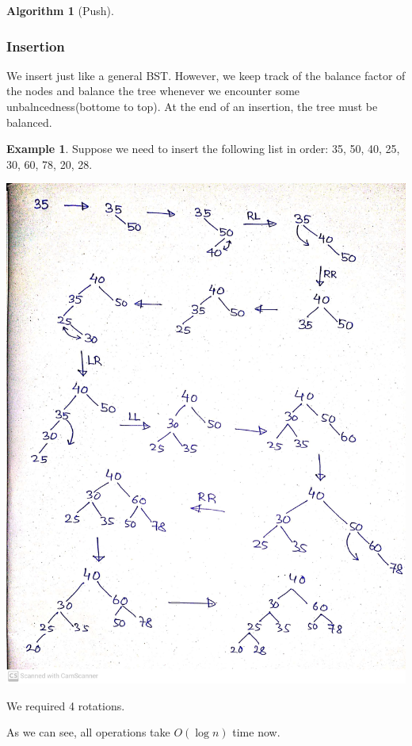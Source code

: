 \documentclass[10pt, a4paper]{extarticle}
\theoremstyle{definition}
\newtheorem{alg}{Algorithm}
\newtheorem{eg}{Example}
\begin{document}
\begin{alg}[Push]
		\subsubsection{Insertion}
		We insert just like a general BST. However, we keep track of the balance factor of the nodes and balance the tree whenever we encounter some unbalncedness(bottome to top). At the end of an insertion, the tree must be balanced.
		\begin{eg}
			Suppose we need to insert the following list in order: 35, 50, 40, 25, 30, 60, 78, 20, 28.
		\begin{center}
			\includegraphics[scale=0.15]{avl-insertion.jpg}\\
		\end{center}
		We required 4 rotations.
		\end{eg}

		As we can see, all operations take $O(\log n)$ time now.


\end{alg}
\end{document}
